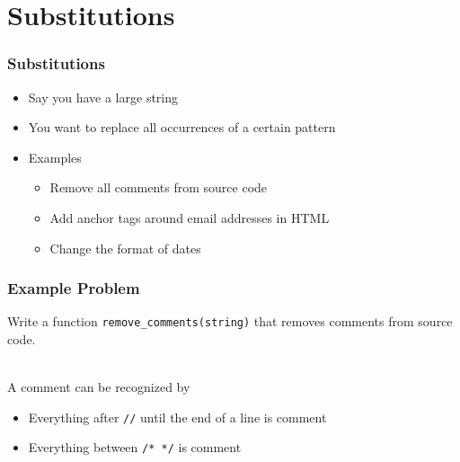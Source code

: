 \section{Substitutions}

\frame{\tableofcontents[currentsection]}

\begin{frame}
  \frametitle{Substitutions}
  \begin{itemize}
    \item Say you have a large string
    \item You want to replace all occurrences of a certain pattern
    \item Examples
      \begin{itemize}
        \item Remove all comments from source code
        \item Add anchor tags around email addresses in HTML
        \item Change the format of dates
      \end{itemize}
  \end{itemize}
\end{frame}

\begin{frame}
  \frametitle{Example Problem}
  \begin{center}
    Write a function \texttt{remove\_comments(string)} that removes comments from source code.
  \end{center}
  \vskip5mm
  \\[2mm]
  A comment can be recognized by
  \begin{itemize}
    \item Everything after \texttt{//} until the end of a line is comment
    \item Everything between \texttt{/* */} is comment
  \end{itemize}
\end{frame}

